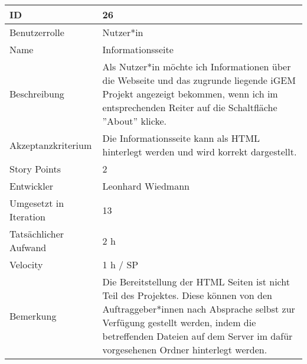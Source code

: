 \begin{tabularx}{\textwidth}{|p{}|X|}
	\hline
	ID & 26\\
	\hline
	Benutzerrolle & Nutzer*in\\
	\hline
	Name & Informationsseite\\
	\hline
	Beschreibung & Als Nutzer*in möchte ich Informationen über die Webseite und das zugrunde liegende iGEM Projekt angezeigt bekommen, wenn ich im entsprechenden Reiter auf die Schaltfläche ''About'' klicke.\\
	\hline
	Akzeptanzkriterium & Die Informationsseite kann als HTML hinterlegt werden und wird korrekt dargestellt.\\
	\hline
	Story Points & 2\\
	\hline
	Entwickler & Leonhard Wiedmann\\
	\hline
	Umgesetzt in Iteration & 13\\
	\hline
	Tatsächlicher Aufwand & 2 h\\
	\hline
	Velocity & 1 h / SP\\
	\hline
	Bemerkung & Die Bereitstellung der HTML Seiten ist nicht Teil des Projektes. Diese können von den Auftraggeber*innen nach Absprache selbst zur Verfügung gestellt werden, indem die betreffenden Dateien auf dem Server im dafür vorgesehenen Ordner hinterlegt werden.\\
	\hline
\end{tabularx}
\vspace{20pt}
